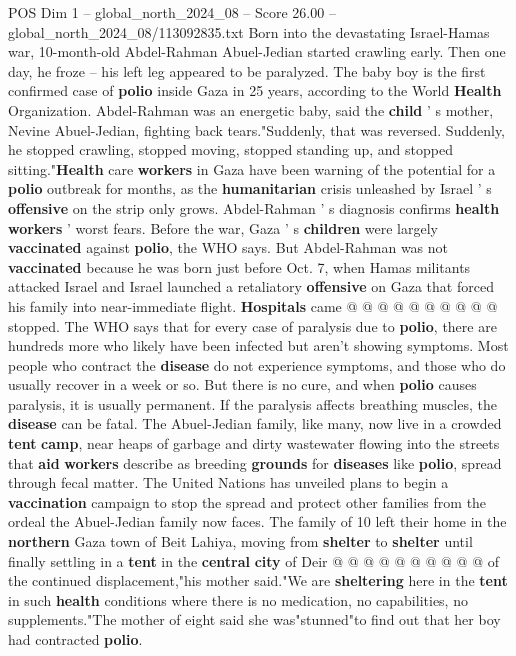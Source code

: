 \begin{textsample}{POS Dim 1 – global\_north\_2024\_08 – Score 26.00 – global\_north\_2024\_08/113092835.txt}  \label{ex:f1_pos_410}
Born into the devastating Israel-Hamas war, 10-month-old Abdel-Rahman Abuel-Jedian started crawling early.
Then one day, he froze -- his left leg appeared to be paralyzed.
The baby boy is the first confirmed case of \textbf{polio} inside Gaza in 25 years, according to the World \textbf{Health} Organization.
Abdel-Rahman was an energetic baby, said the \textbf{child} ' s mother, Nevine Abuel-Jedian, fighting back tears."Suddenly, that was reversed.
Suddenly, he stopped crawling, stopped moving, stopped standing up, and stopped sitting."\textbf{Health} care \textbf{workers} in Gaza have been warning of the potential for a \textbf{polio} outbreak for months, as the \textbf{humanitarian} crisis unleashed by Israel ' s \textbf{offensive} on the strip only grows.
Abdel-Rahman ' s diagnosis confirms \textbf{health} \textbf{workers} ' worst fears.
Before the war, Gaza ' s \textbf{children} were largely \textbf{vaccinated} against \textbf{polio}, the WHO says.
But Abdel-Rahman was not \textbf{vaccinated} because he was born just before Oct. 7, when Hamas militants attacked Israel and Israel launched a retaliatory \textbf{offensive} on Gaza that forced his family into near-immediate flight. \textbf{Hospitals} came @ @ @ @ @ @ @ @ @ @ stopped.
The WHO says that for every case of paralysis due to \textbf{polio}, there are hundreds more who likely have been infected but aren't showing symptoms.
Most people who contract the \textbf{disease} do not experience symptoms, and those who do usually recover in a week or so.
But there is no cure, and when \textbf{polio} causes paralysis, it is usually permanent.
If the paralysis affects breathing muscles, the \textbf{disease} can be fatal.
The Abuel-Jedian family, like many, now live in a crowded \textbf{tent} \textbf{camp}, near heaps of garbage and dirty wastewater flowing into the streets that \textbf{aid} \textbf{workers} describe as breeding \textbf{grounds} for \textbf{diseases} like \textbf{polio}, spread through fecal matter.
The United Nations has unveiled plans to begin a \textbf{vaccination} campaign to stop the spread and protect other families from the ordeal the Abuel-Jedian family now faces.
The family of 10 left their home in the \textbf{northern} Gaza town of Beit Lahiya, moving from \textbf{shelter} to \textbf{shelter} until finally settling in a \textbf{tent} in the \textbf{central} \textbf{city} of Deir @ @ @ @ @ @ @ @ @ @ of the continued displacement,"his mother said."We are \textbf{sheltering} here in the \textbf{tent} in such \textbf{health} conditions where there is no medication, no capabilities, no supplements."The mother of eight said she was"stunned"to find out that her boy had contracted \textbf{polio}.

\end{textsample}
